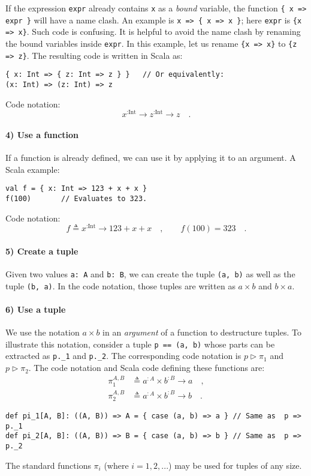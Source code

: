 If the expression \lstinline!expr! already contains \lstinline!x!
as a \emph{bound} variable, the function \lstinline!{ x => expr }!
will have a name clash. An example is \lstinline!x => { x => x }!;
here \lstinline!expr! is \lstinline!{x => x}!. Such code is confusing.
It is helpful to avoid the name clash by renaming the bound variables
inside \lstinline!expr!. In this example, let us rename \lstinline!{x => x}!
to \lstinline!{z => z}!. The resulting code is written in Scala as:
\begin{lstlisting}
{ x: Int => { z: Int => z } }   // Or equivalently:
(x: Int) => (z: Int) => z
\end{lstlisting}
Code notation:
\[
x^{:\text{Int}}\rightarrow z^{:\text{Int}}\rightarrow z\quad.
\]


\paragraph{4) Use a function}

If a function is already defined, we can use it by applying it to
an argument. A Scala example:
\begin{lstlisting}
val f = { x: Int => 123 + x + x }
f(100)       // Evaluates to 323.
\end{lstlisting}
Code notation:
\[
f\triangleq x^{:\text{Int}}\rightarrow123+x+x\quad,\quad\quad f(100)=323\quad.
\]


\paragraph{5) Create a tuple}

Given two values \lstinline!a: A! and \lstinline!b: B!, we can create
the tuple \lstinline!(a, b)! as well as the tuple \lstinline!(b, a)!.
In the code notation, those tuples are written as $a\times b$ and
$b\times a$.

\paragraph{6) Use a tuple}

We use the notation $a\times b$ in an \emph{argument} of a function
to destructure tuples. To illustrate this notation, consider a tuple
\lstinline!p == (a, b)! whose parts can be extracted as \lstinline!p._1!
and \lstinline!p._2!. The corresponding code notation is $p\triangleright\pi_{1}$
and $p\triangleright\pi_{2}$. The code notation and Scala code defining
these functions are:
\begin{align*}
\pi_{1}^{A,B} & \triangleq a^{:A}\times b^{:B}\rightarrow a\quad,\\
\pi_{2}^{A,B} & \triangleq a^{:A}\times b^{:B}\rightarrow b\quad.
\end{align*}
\begin{lstlisting}
def pi_1[A, B]: ((A, B)) => A = { case (a, b) => a } // Same as  p => p._1
def pi_2[A, B]: ((A, B)) => B = { case (a, b) => b } // Same as  p => p._2
\end{lstlisting}
The standard functions $\pi_{i}$ (where $i=1,2,...$) may be used
for tuples of any size. 

